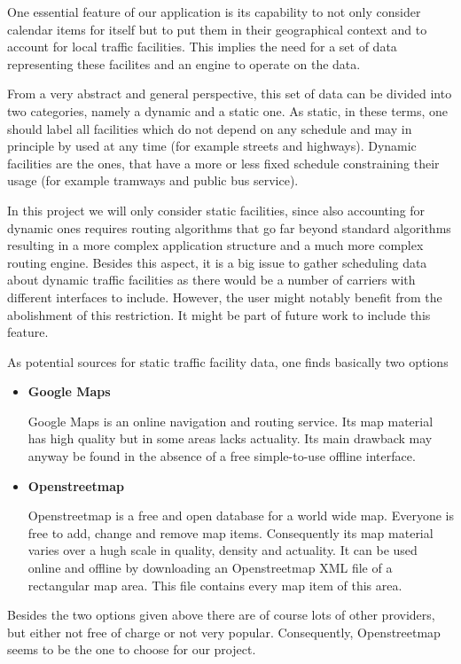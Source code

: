 One essential feature of our application is its capability to not only consider calendar items for itself but to put them in their geographical context and to account for local traffic facilities. This implies the need for a set of data representing these facilites and an engine to operate on the data.\newline

From a very abstract and general perspective, this set of data can be divided into two categories, namely a dynamic and a static one. As static, in these terms, one should label all facilities which do not depend on any schedule and may in principle by used at any time (for example streets and highways). Dynamic facilities are the ones, that have a more or less fixed schedule constraining their usage (for example tramways and public bus service).\newline

In this project we will only consider static facilities, since also accounting for dynamic ones requires routing algorithms that go far beyond standard algorithms resulting in a more complex application structure and a much more complex routing engine. Besides this aspect, it is a big issue to gather scheduling data about dynamic traffic facilities as there would be a number of carriers with different interfaces to include. However, the user might notably benefit from the abolishment of this restriction. It might be part of future work to include this feature.\newline
 
As potential sources for static traffic facility data, one finds basically two options

\begin{itemize}
 
	\item \textbf{Google Maps}
	
		Google Maps is an online navigation and routing service. Its map material has high quality but in some areas lacks actuality. Its main drawback may anyway be found in the absence of a free simple-to-use offline interface. 
	
	\item \textbf{Openstreetmap}
	
		Openstreetmap is a free and open database for a world wide map. Everyone is free to add, change and remove map items. Consequently its map material varies over a hugh scale in quality, density and actuality. It can be used online and offline by downloading an Openstreetmap XML file of a rectangular map area. This file contains every map item of this area.
  
\end{itemize} 

Besides the two options given above there are of course lots of other providers, but either not free of charge or not very popular. Consequently, Openstreetmap seems to be the one to choose for our project.
